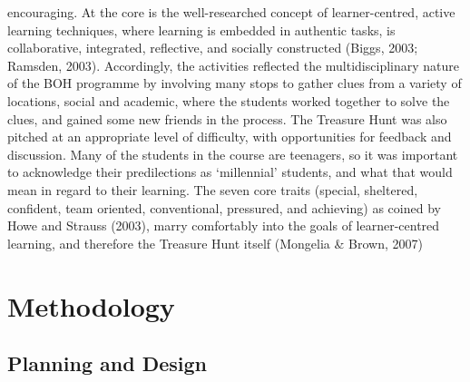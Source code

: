 encouraging. At the core is the well-researched concept of learner-centred, active learning 
techniques, where learning is embedded in authentic tasks, is collaborative, integrated, 
reflective, and socially constructed (Biggs, 2003; Ramsden, 2003). Accordingly, the 
activities reflected the multidisciplinary nature of the BOH programme by involving many 
stops to gather clues from a variety of locations, social and academic, where the students 
worked together to solve the clues, and gained some new friends in the process. The 
Treasure Hunt was also pitched at an appropriate level of difficulty, with opportunities for 
feedback and discussion. Many of the students in the course are teenagers, so it was 
important to acknowledge their predilections as ‘millennial’ students, and what that would 
mean in regard to their learning. The seven core traits (special, sheltered, confident, team 
oriented, conventional, pressured, and achieving) as coined by Howe and Strauss (2003), 
marry comfortably into the goals of learner-centred learning, and therefore the Treasure 
Hunt itself (Mongelia & Brown, 2007)

\section{Methodology}

\subsection{Planning and Design}

